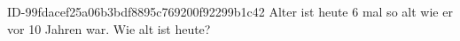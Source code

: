 \begin{exercise}
      {ID-99fdacef25a06b3bdf8895c769200f92299b1c42}
      {Alter}
  \ifproblem\problem
    \xya{} ist heute 6 mal so alt wie er vor 10 Jahren war.
    Wie alt ist \xya{} heute?
  \fi
\end{exercise}
